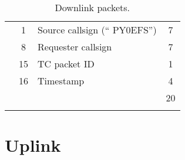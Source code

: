 \begin{longtable}[c]{lcL{0.4\textwidth}c}
                                            & 1  & Source callsign (`` PY0EFS'')        & 7 \\
                                            & 8  & Requester callsign                   & 7 \\
                                            & 15 & TC packet ID                         & 1 \\
                                            & 16 & Timestamp                            & 4 \\
                                            &    &                                      & 20 \\
    \bottomrule[1.5pt]
    \caption{Downlink packets.}
    \label{tab:downlink-packets}
\end{longtable}

\section{Uplink}

